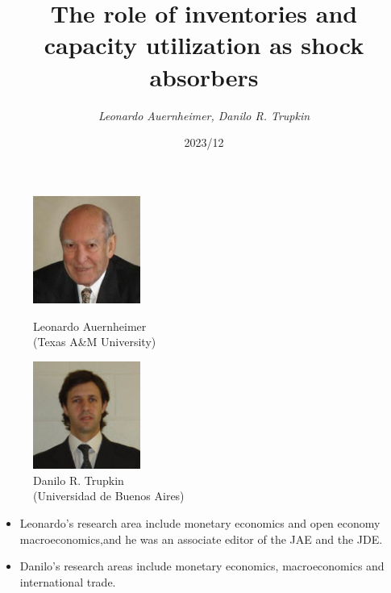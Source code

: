 \documentclass[fontset=windows,12pt,t,aspectratio=169]{beamer}
\title[The role of inventories and capacity utilization]{The role of inventories and capacity utilization as shock absorbers} %
\author[\emph{Leonardo Auernheimer, Danilo R. Trupkin}]{\emph{Leonardo Auernheimer, Danilo R. Trupkin}}
\institute[] {
Review of Economic Dynamics 17 (2014) 70–85\medskip

\normalsize 十三组: 刘方; 张全飞; 王珂辉; 刘淙; 耿宁; 周荣耀%
}
\date {2023/12}
\begin{document}
 {
    \frame {
        \titlepage
    }
}







\begin{frame}
	\begin{multicols}{2}
		\begin{figure}
			\includegraphics[height=100pt]{table/Leon.jpg}
			\caption*{Leonardo Auernheimer\\(Texas A\&M University)}
			\includegraphics[height=100pt]{table/Danilo.png}
			\caption*{Danilo R. Trupkin \\(Universidad de Buenos Aires)}
		\end{figure}
	\end{multicols}
    \vspace{5pt}
    \begin{itemize}
      \item Leonardo's research area include monetary economics and open economy macroeconomics,and he was an associate editor of the JAE and the JDE.
      \item Danilo's research areas include monetary economics, macroeconomics and international trade.
    \end{itemize}
\end{frame}
\end{document}
